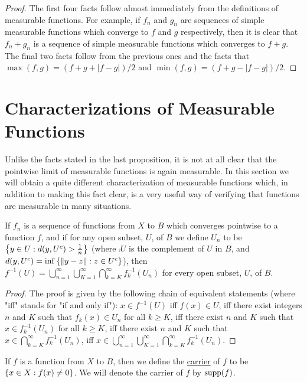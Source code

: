 \begin{proof}
The first four facts follow almost immediately from the definitions of measurable functions. For example, if $f_n$ and $g_n$ are sequences of simple measurable functions which converge to $f$ and $g$ respectively, then it is clear that $f_n+g_n$ is a sequence of simple measurable functions which converges to $f+g$. The final two facts follow from the previous ones and the facts that $\max(f, g)=(f+g+|f-g|)/2$ and $\min(f, g)=(f+g-|f-g|)/2$.
\end{proof}

\section{Characterizations of Measurable Functions}

Unlike the facts stated in the last proposition, it is not at all clear that the pointwise limit of measurable functions is again measurable. In this section we will obtain a quite different characterization of measurable functions which, in addition to making this fact clear, is a very useful way of verifying that functions are measurable in many situations.

\begin{lemma}
\label{lem:preimage of open set as sigma union intersection}
If $f_n$ is a sequence of functions from $X$ to $B$ which converges pointwise to a function $f$, and if for any open subset, $U$, of $B$ we define $U_n$ to be $\left\{y \in U: d(y, {U}^c)>\frac1n\right\}$ (where $\comp{U}$ is the complement of $U$ in $B$, and $d(y, {U}^c)=\inf\left\{\norm{y-z}:z\in{U}^c\right\}$), then $f^{-1}(U)=\bigcup_{n=1}^\infty\bigcup_{K=1}^\infty\bigcap_{k=K}^\infty f_k^{-1}(U_n)$ for every open subset, $U$, of $B$.
\end{lemma}

\begin{proof}
The proof is given by the following chain of equivalent statements (where "iff" stands for "if and only if"): $x \in f^{-1}(U)$ iff $f(x) \in U$, iff there exist integers $n$ and $K$ such that $f_k(x) \in U_n$ for all $k \geq K$, iff there exist $n$ and $K$ such that $x \in f_k^{-1}(U_n)$ for all $k \geq K$, iff there exist $n$ and $K$ such that $x \in\bigcap_{k=K}^\infty f_k^{-1}(U_n)$, iff $x \in \bigcup_{n=1}^\infty \bigcup_{K=1}^\infty \bigcap_{k=K}^\infty f_k^{-1}(U_n)$.
\end{proof}

\begin{definition}
If $f$ is a function from $X$ to $B$, then we define the \underline{carrier} of $f$ to be $\left\{x \in X: f(x) \neq 0\right\}$. We will denote the carrier of $f$ by $\operatorname{supp}(f)$. 
\end{definition}

